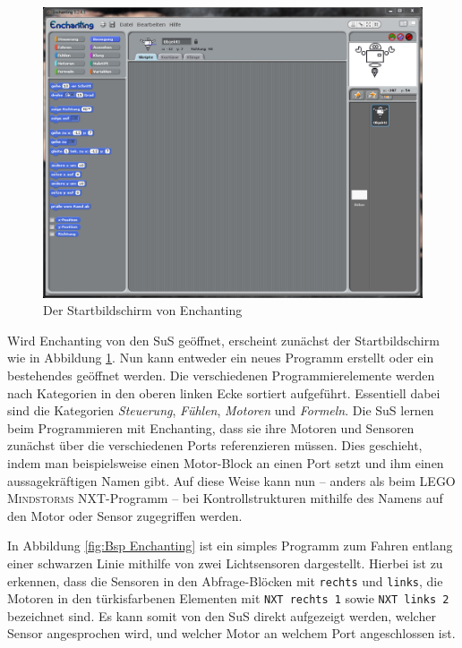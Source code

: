 \documentclass[paper=a4, DIV=calc, BCOR=12mm, twoside=on, onecolumn=on, open = right, titlepage =on, parskip =half-, headsepline = on, footsepline = off, chapterprefix = off, appendixprefix = on, fontsize = 12pt, numbers = noenddot, abstract = on]{scrbook}
\begin{document}
\begin{figure}[htbp]
\centering
\includegraphics[width=\textwidth]{images/Enchanting_Start.png} 
\caption{Der Startbildschirm von Enchanting}
\label{fig:Enchanting Start}
\end{figure}
\clearpage

Wird Enchanting von den SuS geöffnet, erscheint zunächst der Startbildschirm wie in Abbildung \ref{fig:Enchanting Start}. Nun kann entweder ein neues Programm erstellt oder ein bestehendes geöffnet werden. Die verschiedenen Programmierelemente werden nach Kategorien in den oberen linken Ecke sortiert aufgeführt. Essentiell dabei sind die Kategorien \emph{Steuerung}, \emph{Fühlen}, \emph{Motoren} und \emph{Formeln}. Die SuS lernen beim Programmieren mit Enchanting, dass sie ihre Motoren und Sensoren zunächst über die verschiedenen Ports referenzieren müssen. Dies geschieht, indem man beispielsweise einen Motor-Block an einen Port setzt und ihm einen aussagekräftigen Namen gibt. Auf diese Weise kann nun -- anders als beim \textsc{LEGO Mindstorms} NXT-Programm -- bei Kontrollstrukturen mithilfe des Namens auf den Motor oder Sensor zugegriffen werden.

In Abbildung \ref{fig:Bsp Enchanting} ist ein simples Programm zum Fahren entlang einer schwarzen Linie mithilfe von zwei Lichtsensoren dargestellt. Hierbei ist zu erkennen, dass die Sensoren in den Abfrage-Blöcken mit \texttt{rechts} und \texttt{links}, die Motoren in den türkisfarbenen Elementen mit \texttt{NXT rechts 1} sowie \texttt{NXT links 2} bezeichnet sind. Es kann somit von den SuS direkt aufgezeigt werden, welcher Sensor angesprochen wird, und welcher Motor an welchem Port angeschlossen ist.
\end{document}
